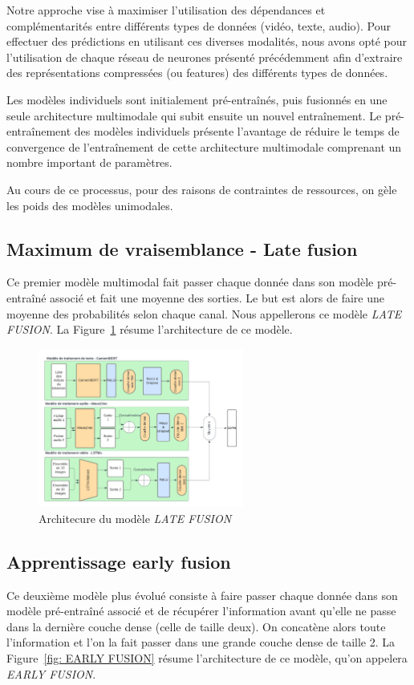 Notre approche vise à maximiser l'utilisation des dépendances et complémentarités entre différents types de données (vidéo, texte,
audio). Pour effectuer des prédictions en utilisant ces diverses modalités, nous avons opté pour l'utilisation de chaque réseau de
neurones présenté précédemment afin d'extraire des représentations compressées (ou features) des différents types de données. 

Les modèles individuels sont initialement pré-entraînés, puis fusionnés en une seule architecture multimodale qui subit ensuite un
nouvel entraînement. Le pré-entraînement des modèles individuels présente l'avantage de réduire le temps de convergence de
l'entraînement de cette architecture multimodale comprenant un nombre important de paramètres.

Au cours de ce processus, pour des raisons de contraintes de ressources, on gèle les poids des modèles unimodales.

\subsection{Maximum de vraisemblance - Late fusion}
Ce premier modèle multimodal fait passer chaque donnée dans son modèle pré-entraîné associé et fait une moyenne des sorties. Le but
est alors de faire une moyenne des probabilités selon chaque canal. Nous appellerons ce modèle \textit{LATE FUSION}.
La Figure~\ref{fig: LATE FUSION} résume l'architecture de ce modèle.

\begin{figure}[H]
    \centering
    \includegraphics[width=0.6\textwidth]{image_model/late_fusion.png}
    \caption{Architecure du modèle \textit{LATE FUSION}}
    \label{fig: LATE FUSION}
\end{figure}

\subsection{Apprentissage early fusion}
Ce deuxième modèle plus évolué consiste à faire passer chaque donnée dans son modèle pré-entraîné associé et de récupérer
l'information avant qu'elle ne passe dans la dernière couche dense (celle de taille deux). On concatène alors toute l'information 
et l'on la fait passer dans une grande couche dense de taille 2.
La Figure~\ref{fig: EARLY FUSION} résume l'architecture de ce modèle, qu'on appelera \textit{EARLY FUSION}.

